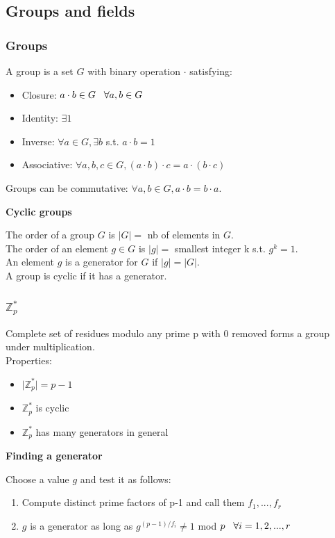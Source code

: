 \documentclass{article}
\begin{document}
\subsection{Groups and fields}

\subsubsection{Groups}

A group is a set $G$ with binary operation $\cdot$ satisfying:
\begin{itemize}
    \item Closure: $a \cdot b \in G \hspace{0.3cm} \forall a,b \in G$
    \item Identity: $\exists 1$
    \item Inverse: $\forall a \in G, \exists b $ s.t. $a\cdot b = 1$
    \item Associative: $\forall a,b,c \in G, (a\cdot b)\cdot c = a\cdot (b\cdot c)$
\end{itemize}
Groups can be commutative: $\forall a,b \in G, a\cdot b = b\cdot a$.

\textbf{Cyclic groups}

The order of a group $G$ is $\vert G \vert =$ nb of elements in $G$.\\
The order of an element $g \in G$ is $\vert g \vert =$ smallest integer k s.t. $g^k = 1$.\\
An element $g$ is a generator for $G$ if $\vert g \vert = \vert G \vert$.\\
A group is cyclic if it has a generator.

\subsubsection{$\mathbb{Z}^*_p$}

Complete set of residues modulo any prime p with 0 removed forms a group under multiplication.\\
Properties:
\begin{itemize}
    \item $\vert \mathbb{Z}^*_p \vert = p-1$
    \item $\mathbb{Z}^*_p$ is cyclic
    \item $\mathbb{Z}^*_p$ has many generators in general
\end{itemize}

\textbf{Finding a generator}

Choose a value $g$ and test it as follows:
\begin{enumerate}
    \item Compute distinct prime factors of p-1 and call them $f_1, ..., f_r$
    \item $g$ is a generator as long as $g^{(p-1)/f_i} \neq 1 $ mod $p \hspace{0.3cm}\forall i=1,2,...,r$ 
\end{enumerate}
\end{document}
